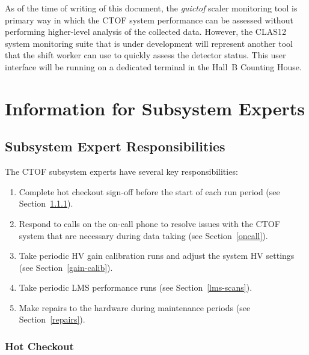 \documentclass[12pt]{article}
\begin{document}
As of the time of writing of this document, the {\it guictof} scaler monitoring tool is primary way
in which the CTOF system performance can be assessed without performing higher-level analysis of
the collected data. However, the CLAS12 system monitoring suite that is under development will
represent another tool that the shift worker can use to quickly assess the detector status. This
user interface will be running on a dedicated terminal in the Hall~B Counting House.

\vfil
\eject

\section{Information for Subsystem Experts}

\subsection{Subsystem Expert Responsibilities}

The CTOF subsystem experts have several key responsibilities:

\begin{enumerate}
\item Complete hot checkout sign-off before the start of each run period (see Section~\ref{checkout}).
\item Respond to calls on the on-call phone to resolve issues with the CTOF system that are necessary 
during data taking (see Section~\ref{oncall}).
\item Take periodic HV gain calibration runs and adjust the system HV settings (see 
Section~\ref{gain-calib}).
\item Take periodic LMS performance runs (see Section~\ref{lms-scans}).
\item Make repairs to the hardware during maintenance periods (see Section~\ref{repairs}).
\end{enumerate}

\subsubsection{Hot Checkout}
\label{checkout}
\end{document}
